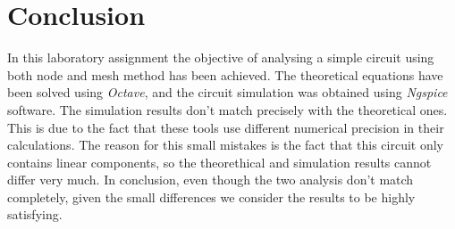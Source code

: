 \section{Conclusion}
\label{sec:conclusion}

In this laboratory assignment the objective of analysing a simple circuit using both node and mesh method has been achieved. The theoretical equations have been solved using \textit{Octave}, and the circuit simulation was obtained using \textit{Ngspice} software. The simulation results don't match precisely with the theoretical ones. This is due to the fact that these tools use different numerical precision in their calculations. The reason for this small mistakes is the fact that this circuit only contains linear components, so the theorethical and simulation results cannot differ very much. In conclusion, even though the two analysis don't match completely, given the small differences we consider the results to be highly satisfying.
